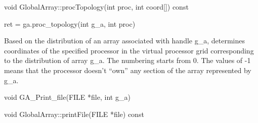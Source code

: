 \documentclass[10pt]{article}
\begin{document}
\begin{cxxapi}
\begin{cxxcode}
void GlobalArray::procTopology(int proc, int coord[]) const
\end{cxxcode}
\begin{funcargs}
\end{funcargs}
\end{cxxapi}

\begin{pyapi}
\begin{pycode}
ret = ga.proc_topology(int g_a, int proc)
\end{pycode}
\begin{funcargs}
\end{funcargs}
\end{pyapi}

\local

\begin{desc}

Based on the distribution of an array associated with handle g_a, determines
coordinates of the specified processor in the virtual processor grid
corresponding to the distribution of array g_a. The numbering starts from 0.
The values of -1 means that the processor doesn't ``own'' any section of the
array represented by g_a.

\end{desc}



\begin{capi}
\begin{ccode}
void GA_Print_file(FILE *file, int g_a)
\end{ccode}
\begin{funcargs}
\end{funcargs}
\end{capi}

\begin{cxxapi}
\begin{cxxcode}
void GlobalArray::printFile(FILE *file) const
\end{cxxcode}
\begin{funcargs}
\end{funcargs}
\end{cxxapi}
\end{document}
